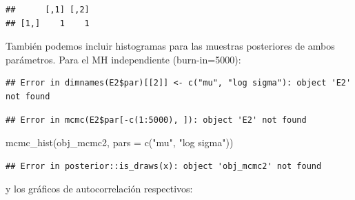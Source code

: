 \documentclass[
  12pt,
]{book}
\newenvironment{Shaded}{\begin{snugshade}}{\end{snugshade}}
\newcommand{\AttributeTok}[1]{\textcolor[rgb]{0.77,0.63,0.00}{#1}}
\newcommand{\DecValTok}[1]{\textcolor[rgb]{0.00,0.00,0.81}{#1}}
\newcommand{\FunctionTok}[1]{\textcolor[rgb]{0.00,0.00,0.00}{#1}}
\newcommand{\NormalTok}[1]{#1}
\newcommand{\OtherTok}[1]{\textcolor[rgb]{0.56,0.35,0.01}{#1}}
\newcommand{\SpecialCharTok}[1]{\textcolor[rgb]{0.00,0.00,0.00}{#1}}
\newcommand{\StringTok}[1]{\textcolor[rgb]{0.31,0.60,0.02}{#1}}
\begin{document}
\begin{verbatim}
##      [,1] [,2]
## [1,]    1    1
\end{verbatim}

También podemos incluir histogramas para las muestras posteriores de
ambos parámetros. Para el MH independiente (burn-in=5000):

\begin{Shaded}
\end{Shaded}

\begin{verbatim}
## Error in dimnames(E2$par)[[2]] <- c("mu", "log sigma"): object 'E2' not found
\end{verbatim}

\begin{Shaded}
\end{Shaded}

\begin{verbatim}
## Error in mcmc(E2$par[-c(1:5000), ]): object 'E2' not found
\end{verbatim}

\begin{Shaded}
\begin{Highlighting}[]
\FunctionTok{mcmc\_hist}\NormalTok{(obj\_mcmc2, }\AttributeTok{pars =} \FunctionTok{c}\NormalTok{(}\StringTok{"mu"}\NormalTok{, }\StringTok{"log sigma"}\NormalTok{))}
\end{Highlighting}
\end{Shaded}

\begin{verbatim}
## Error in posterior::is_draws(x): object 'obj_mcmc2' not found
\end{verbatim}

y los gráficos de autocorrelación respectivos:
\end{document}
